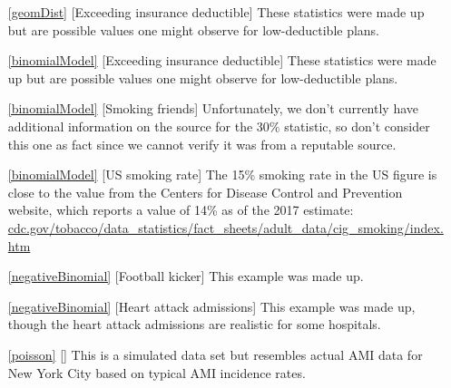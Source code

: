 \begin{itemize}
\item[\ref{geomDist}]
    [Exceeding insurance deductible]
    These statistics were made up but are possible
    values one might observe for low-deductible plans.

\item[\ref{binomialModel}]
    [Exceeding insurance deductible]
    These statistics were made up but are possible
    values one might observe for low-deductible plans.
\item[\ref{binomialModel}]
    [Smoking friends]
    Unfortunately, we don't currently have additional
    information on the source for the 30\% statistic,
    so don't consider this one as fact since we cannot
    verify it was from a reputable source.    
\item[\ref{binomialModel}]
    [US smoking rate]
    The 15\% smoking rate in the US figure is close to
    the value from the Centers for Disease Control and
    Prevention website, which reports a value of 14\%
    as of the 2017 estimate: \\
    \href{https://www.cdc.gov/tobacco/data_statistics/fact_sheets/adult_data/cig_smoking/index.htm}{cdc.gov/tobacco/data\_statistics/fact\_sheets/adult\_data/cig\_smoking/index.htm}

\item[\ref{negativeBinomial}]
    [Football kicker]
    This example was made up.
\item[\ref{negativeBinomial}]
    [Heart attack admissions]
    This example was made up, though the heart attack
    admissions are realistic for some hospitals.

\item[\ref{poisson}]
    [\datalink{ami\_occurrences}]
    This is a simulated data set but resembles actual
    AMI data for New York City based on typical AMI
    incidence rates.
\end{itemize}








\section{}
\label{ch_foundations_for_inf_data}

